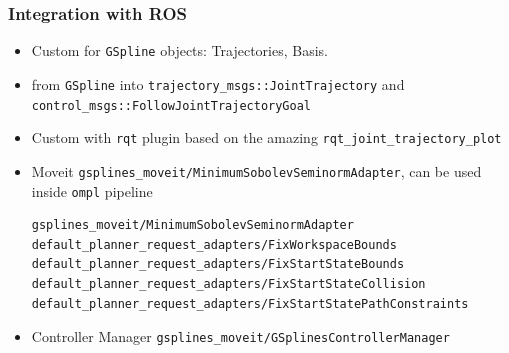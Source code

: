 \begin{frame}[fragile]
	\frametitle{Integration with ROS}
	\begin{itemize}
		\item Custom  for \Verb|GSpline| objects: Trajectories, Basis.
		\item {} from \Verb|GSpline| into \Verb|trajectory_msgs::JointTrajectory| and \Verb|control_msgs::FollowJointTrajectoryGoal|
		\item Custom  with \Verb|rqt| plugin based on the amazing \Verb|rqt_joint_trajectory_plot|
		\item Moveit  \Verb|gsplines_moveit/MinimumSobolevSeminormAdapter|, can be used inside \Verb|ompl| pipeline
		      \begin{lstlisting}
gsplines_moveit/MinimumSobolevSeminormAdapter
default_planner_request_adapters/FixWorkspaceBounds
default_planner_request_adapters/FixStartStateBounds
default_planner_request_adapters/FixStartStateCollision
default_planner_request_adapters/FixStartStatePathConstraints
	          \end{lstlisting}
		\item  Controller Manager \Verb|gsplines_moveit/GSplinesControllerManager|
	\end{itemize}
\end{frame}


